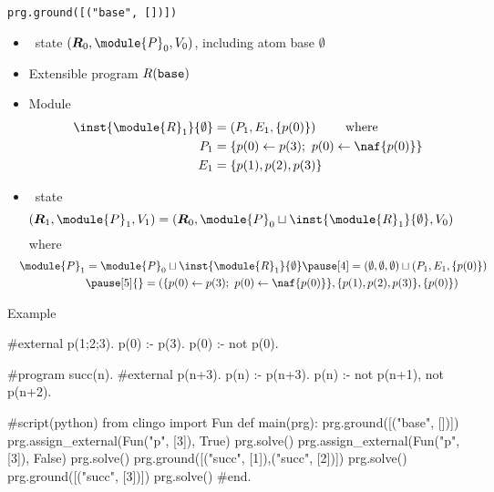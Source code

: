 \begin{frame}{\texttt{prg.ground([("base", [])])}}
  \begin{itemize}
  \item {} \clingo\ state $(\boldsymbol{\RRG}_0,\module{P}_0,V_0 )$, including atom base $\emptyset$
  \item {}  Extensible program $R(\mathtt{base})$
  \item<2->  Module
      \begin{align*}
        \inst{\module{\RRG}_1}{\emptyset} & {} = (P_1,E_1,\{p(0)\})   \qquad\text{ where}\\
        P_1 & {} = \{p(0)\leftarrow p(3);\ p(0)\leftarrow \naf{p(0)}\}             \\
        E_1 & {} = \{p(1),p(2),p(3)\}
      \end{align*}
  \item<3->  \clingo\ state
    \[
    \hspace{-10pt}
    (\boldsymbol{\RRG}_1,\module{P}_1,V_1 )
    =
    (
     \boldsymbol{\RRG}_0,\module{P}_0 \sqcup \inst{\module{\RRG}_1}{\emptyset},V_0
    )
    \]
    where
    \begin{align*}
    \hspace{-10pt}
      \module{P}_1
      & {} =
      \module{P}_0 \sqcup \inst{\module{\RRG}_1}{\emptyset}
      \pause[4] =
      (\emptyset,\emptyset,\emptyset) \sqcup (P_1,E_1,\{p(0)\})\\
      &\pause[5] {} =
      (
      \{
      p(0)\leftarrow p(3);\
      p(0)\leftarrow \naf{p(0)}
      \},
      \{p(1),p(2),p(3)\},
      \{p(0)\}
      )
    \end{align*}
  \end{itemize}
\end{frame}
\begin{frame}[fragile]{Example}
\scriptsize\vspace{-10pt}%
\begin{semiverbatim}
   #external p(1;2;3).
   p(0) :- p(3).
   p(0) :- not p(0).

   #program succ(n).
   #external p(n+3).
   p(n) :- p(n+3).
   p(n) :- not p(n+1), not p(n+2).

   #script(python)
   from clingo import Fun
   def main(prg):
     \alert<1>{prg.ground([("base", [])])}
\only<2>{\alert{>>}}\only<1>{  }     \alert<2>{prg.assign_external(Fun("p", [3]), True)}
       prg.solve()
       prg.assign_external(Fun("p", [3]), False)
       prg.solve()
       prg.ground([("succ", [1]),("succ", [2])])
       prg.solve()
       prg.ground([("succ", [3])])
       prg.solve()
   #end.
\end{semiverbatim}
\end{frame}
